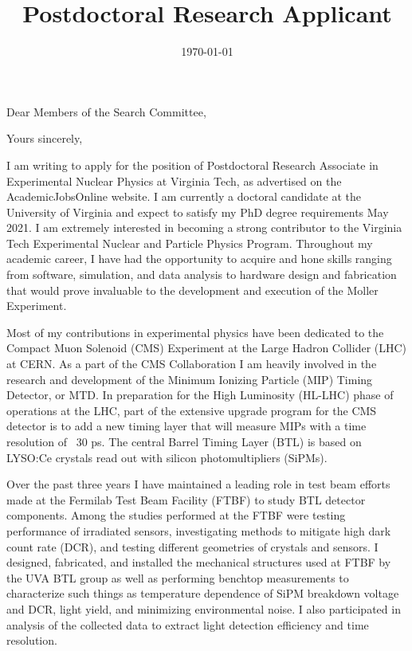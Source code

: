 \documentclass[10pt,a4paper,sans,english]{moderncv}        %
\title{Postdoctoral Research Applicant}                               %
\begin{document}
\date{\today}
\opening{Dear Members of the Search Committee,}
\closing{Yours sincerely,}
\makelettertitle

I am writing to apply for the position of Postdoctoral Research Associate in Experimental Nuclear Physics at Virginia Tech, as advertised on the AcademicJobsOnline website.  I am currently a doctoral candidate at the University of Virginia and expect to satisfy my PhD degree requirements May 2021.  I am extremely interested in becoming a strong contributor to the Virginia Tech Experimental Nuclear and Particle Physics Program.  Throughout my academic career, I have had the opportunity to acquire and hone skills ranging from software, simulation, and data analysis to hardware design and fabrication that would prove invaluable to the development and execution of the Moller Experiment.

Most of my contributions in experimental physics have been dedicated to the Compact Muon Solenoid (CMS) Experiment at the Large Hadron Collider (LHC) at CERN.  As a part of the CMS Collaboration I am heavily involved in the research and development of the Minimum Ionizing Particle (MIP) Timing Detector, or MTD.  In preparation for the High Luminosity (HL-LHC) phase of operations at the LHC, part of the extensive upgrade program for the CMS detector is to add a new timing layer that will measure MIPs with a time resolution of ~30 ps.  The central Barrel Timing Layer (BTL) is based on LYSO:Ce crystals read out with silicon photomultipliers (SiPMs).  

Over the past three years I have maintained a leading role in test beam efforts made at the Fermilab Test Beam Facility (FTBF) to study BTL detector components.  Among the studies performed at the FTBF were testing performance of irradiated sensors, investigating methods to mitigate high dark count rate (DCR), and testing different geometries of crystals and sensors.  I designed, fabricated, and installed the mechanical structures used at FTBF by the UVA BTL group as well as performing benchtop measurements to characterize such things as temperature dependence of SiPM breakdown voltage and DCR, light yield, and minimizing environmental noise.  I also participated in analysis of the collected data to extract light detection efficiency and time resolution.
\end{document}
